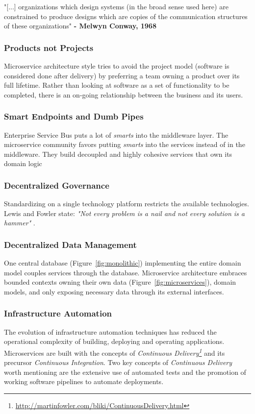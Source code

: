 \begin{citat} []
"[...] organizations which design  systems (in the broad sense used here) are constrained to produce designs which are copies of the communication structures of these organizations" \textbf{- Melwyn Conway, 1968} \cite[p. 31]{conway1968law} 
\end{citat}


\subsubsection*{Products not Projects}
Microservice architecture style tries to avoid the project model (software is considered done after delivery) by preferring a team owning a product over its full lifetime. Rather than looking at software as a set of functionality to be completed, there is an on-going relationship between the business and its users.


\subsubsection*{Smart Endpoints and Dumb Pipes}
Enterprise Service Bus puts a lot of \textit{smarts} into the middleware layer. The microservice community favors putting \textit{smarts} into the services instead of in the middleware. They build decoupled and highly cohesive services that own its domain logic

\subsubsection*{Decentralized Governance}
Standardizing on a single technology platform restricts the available technologies. Lewis and Fowler state: \textit{"Not every problem is a nail and not every solution is a hammer"} \cite[p. 8]{lewis2014microservices}.

\subsubsection*{Decentralized Data Management} 
One central database (Figure~\ref{fig:monolithic}) implementing the entire domain model couples services through the database. Microservice architecture embraces bounded contexts owning their own data (Figure~\ref{fig:microservices}), domain models, and only exposing necessary data through its external interfaces.


\subsubsection*{Infrastructure Automation}
The evolution of infrastructure automation techniques has reduced the operational complexity of building, deploying and operating applications. Microservices are built with the concepts of \textit{Continuous Delivery\footnote{\url{http://martinfowler.com/bliki/ContinuousDelivery.html}}} and its precursor \textit{Continuous Integration}. Two key concepts of \textit{Continuous Delivery} worth mentioning are the extensive use of automated tests and the promotion of working software pipelines to automate deployments.


